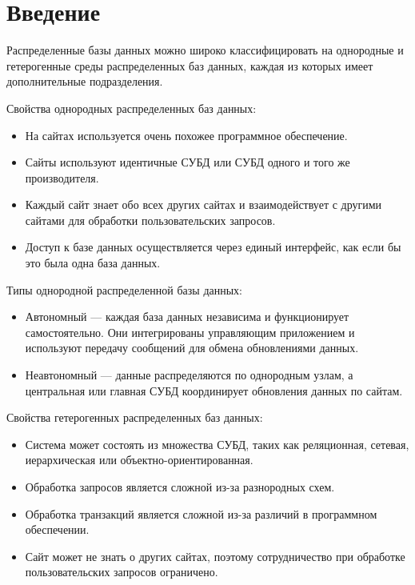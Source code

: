 \graphicspath{{/img}} %

\section*{\LARGE Введение}

Распределенные базы данных можно широко классифицировать на
однородные и гетерогенные среды распределенных баз данных, каждая из
которых имеет дополнительные подразделения.

Свойства однородных распределенных баз данных:
\begin{itemize}
	\item На сайтах используется очень похожее программное обеспечение.
	\item Сайты используют идентичные СУБД или СУБД одного и того же
	производителя.
	\item Каждый сайт знает обо всех других сайтах и взаимодействует с
	другими сайтами для обработки пользовательских запросов.
	\item Доступ к базе данных осуществляется через единый интерфейс, как
	если бы это была одна база данных.
\end{itemize}

Типы однородной распределенной базы данных:
\begin{itemize}
	\item Автономный — каждая база данных независима и функционирует
	самостоятельно. Они интегрированы управляющим приложением и
	используют передачу сообщений для обмена обновлениями данных.
	\item Неавтономный — данные распределяются по однородным узлам, а
	центральная или главная СУБД координирует обновления данных по
	сайтам.
\end{itemize}

Свойства гетерогенных распределенных баз данных:
\begin{itemize}
	\item Система может состоять из множества СУБД, таких как реляционная,
	сетевая, иерархическая или объектно-ориентированная.
	\item Обработка запросов является сложной из-за разнородных схем.
	\item Обработка транзакций является сложной из-за различий в
	программном обеспечении.
	\item Сайт может не знать о других сайтах, поэтому сотрудничество при
	обработке пользовательских запросов ограничено.
\end{itemize}

